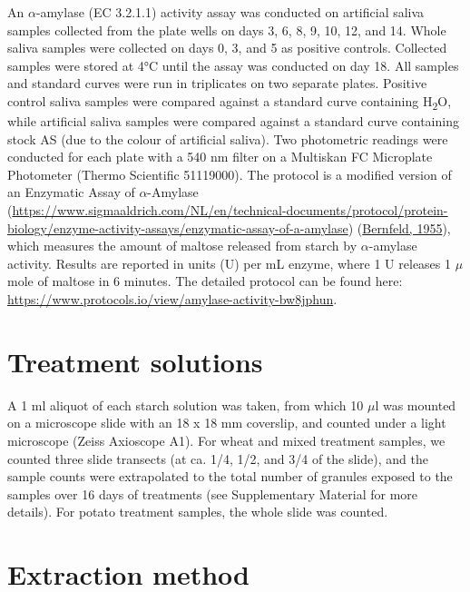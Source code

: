 \documentclass[
  letterpaper,
]{book}
\begin{document}
An \(\alpha\)-amylase (EC 3.2.1.1) activity assay was conducted on
artificial saliva samples collected from the plate wells on days 3, 6,
8, 9, 10, 12, and 14. Whole saliva samples were collected on days 0, 3,
and 5 as positive controls. Collected samples were stored at 4°C until
the assay was conducted on day 18. All samples and standard curves were
run in triplicates on two separate plates. Positive control saliva
samples were compared against a standard curve containing
H\textsubscript{2}O, while artificial saliva samples were compared
against a standard curve containing stock AS (due to the colour of
artificial saliva). Two photometric readings were conducted for each
plate with a 540 nm filter on a Multiskan FC Microplate Photometer
(Thermo Scientific 51119000). The protocol is a modified version of an
Enzymatic Assay of \(\alpha\)-Amylase
(\url{https://www.sigmaaldrich.com/NL/en/technical-documents/protocol/protein-biology/enzyme-activity-assays/enzymatic-assay-of-a-amylase})
(\protect\hyperlink{ref-bernfeldAmylase1955}{Bernfeld, 1955}), which
measures the amount of maltose released from starch by
\(\alpha\)-amylase activity. Results are reported in units (U) per mL
enzyme, where 1 U releases 1 \(\mu\)mole of maltose in 6 minutes. The
detailed protocol can be found here:
\url{https://www.protocols.io/view/amylase-activity-bw8jphun}.

\hypertarget{treatment-solutions}{%
\section{Treatment solutions}\label{treatment-solutions}}

A 1 ml aliquot of each starch solution was taken, from which 10 \(\mu\)l
was mounted on a microscope slide with an 18 x 18 mm coverslip, and
counted under a light microscope (Zeiss Axioscope A1). For wheat and
mixed treatment samples, we counted three slide transects (at ca. 1/4,
1/2, and 3/4 of the slide), and the sample counts were extrapolated to
the total number of granules exposed to the samples over 16 days of
treatments (see Supplementary Material for more details). For potato
treatment samples, the whole slide was counted.

\hypertarget{extraction-method}{%
\section{Extraction method}\label{extraction-method}}
\end{document}
